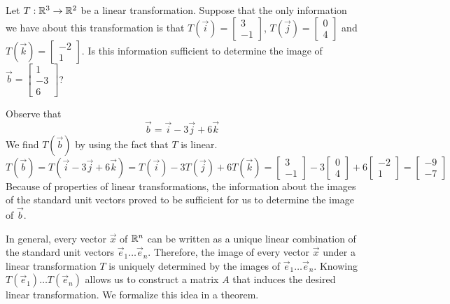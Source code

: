 \documentclass{ximera}
\begin{document}
\begin{example}  
Let $T:\mathbb{R}^3\rightarrow \mathbb{R}^2$ be a linear transformation. Suppose that the only information we have about this transformation is that $T(\vec{i})=\begin{bmatrix}3\\-1\end{bmatrix}$, $T(\vec{j})=\begin{bmatrix}0\\4\end{bmatrix}$ and $T(\vec{k})=\begin{bmatrix}-2\\1\end{bmatrix}$.  Is this information sufficient to determine the image of $\vec{b}=\begin{bmatrix}1\\-3\\6\end{bmatrix}$?

\begin{explanation}  Observe that 
$$\vec{b}=\vec{i}-3\vec{j}+6\vec{k}$$
We find $T(\vec{b})$ by using the fact that $T$ is linear.
$$T(\vec{b})=T(\vec{i}-3\vec{j}+6\vec{k})=T(\vec{i})-3T(\vec{j})+6T(\vec{k})=\begin{bmatrix}3\\-1\end{bmatrix}-3\begin{bmatrix}0\\4\end{bmatrix}+6\begin{bmatrix}-2\\1\end{bmatrix}=\begin{bmatrix}-9\\-7\end{bmatrix}$$
Because of properties of linear transformations, the information about the images of the standard unit vectors proved to be sufficient for us to determine the image of $\vec{b}$. 
\end{explanation}
\end{example}

In general, every vector $\vec{x}$ of $\mathbb{R}^n$ can be written as a unique linear combination of the standard unit vectors $\vec{e}_1\ldots \vec{e}_n$.  Therefore, the image of every vector $\vec{x}$ under a linear transformation $T$ is uniquely determined by the images of $\vec{e}_1\ldots \vec{e}_n$.  Knowing $T(\vec{e}_1)\ldots T(\vec{e}_n)$ allows us to construct a matrix $A$ that induces the desired linear transformation.  We formalize this idea in a theorem.
\end{document}
